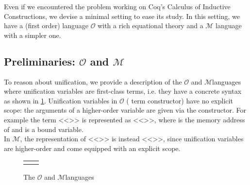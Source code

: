 \documentclass[sigconf,natbib=false,review]{acmart}
\newcommand{\llambda}{\ensuremath{\mathcal{L}}\xspace}
\newcommand{\Fo}{\texorpdfstring{\ensuremath{\mathcal{O}\xspace}}{O}} %
\newcommand{\Ho}{\texorpdfstring{\ensuremath{\mathcal{M}}\xspace}{M}}
\begin{document}
\newcommand{\maybeeta}{\texorpdfstring{\ensuremath{\Diamond\eta}\xspace}{maybeeta}}
\newcommand{\maybebeta}{\texorpdfstring{\ensuremath{\Diamond\beta}\xspace}{maybebeta}}
\newcommand{\notllambda}{\texorpdfstring{\ensuremath{\Diamond\llambda}\xspace}{maybellam}}

Even if we encountered the problem working on Coq's Calculus of Inductive
Constructions, we devise
a minimal setting to ease its study. In this setting, we have
a (first order) language \Fo{} with a rich equational
theory and a \Ho{} language with a simpler one.


\subsection{Preliminaries: \Fo{} and \Ho{}}

To reason about unification, we provide a description of the
\Fo{} and \Ho languages where unification variables
are first-class terms, i.e. they have a concrete syntax as
shown in \cref{code:common-terms}.
Unification variables
in \Fo{} ( term constructor) have no explicit scope:
the arguments of a higher-order variable are given via the 
constructor. For example the term <<>> is represented as
<<>>, where  is the memory address
of  and  is a bound variable.\\
In \Ho, the representation of <<>> is instead <<>>,
since unification variables are higher-order and come equipped with an
explicit scope.
%
%
{
\setlength{\abovecaptionskip}{0pt}
\setlength{\belowcaptionskip}{-13pt}
\begin{figure}[b] %
  \begin{tabular}{ll}
  \begin{minipage}{0.21\textwidth}
   {code/fo_tm}
  \end{minipage}
  &
  \begin{minipage}{0.24\textwidth}
   {code/ho_tm}
  \end{minipage}
  \end{tabular}\vspace{4pt}
  \caption{The \Fo{} and \Ho languages}\vspace{0.3em}
  \label{code:common-terms}
\end{figure}
}
%
\end{document}
